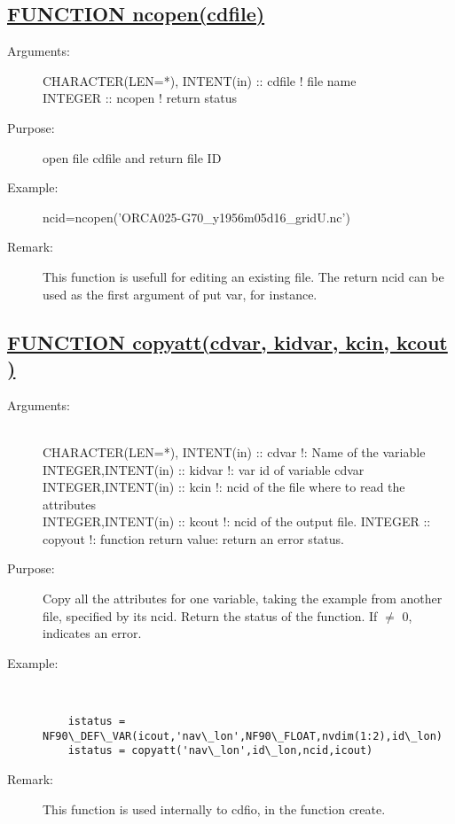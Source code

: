 \documentclass[a4paper,11pt]{article}
\begin{document}
\subsection*{\underline{ FUNCTION ncopen(cdfile) }}
\begin{description}
\item[Arguments:]  
      CHARACTER(LEN=*), INTENT(in) :: cdfile ! file name \\
      INTEGER :: ncopen                      ! return status
\item[Purpose:] open file cdfile and return file ID
\item[Example:]  ncid=ncopen('ORCA025-G70\_y1956m05d16\_gridU.nc')
\item[Remark:] This function is usefull for editing an existing file. The return ncid can be used as the first argument of
      put var, for instance.
\end{description}

\subsection*{\underline{ FUNCTION copyatt(cdvar, kidvar, kcin, kcout )}}
\begin{description}
\item[Arguments:] \ \\
CHARACTER(LEN=*), INTENT(in) :: cdvar !: Name of the variable \\
INTEGER,INTENT(in) :: kidvar   !: var id of variable cdvar \\
INTEGER,INTENT(in) :: kcin     !: ncid of the file where to read the attributes \\
INTEGER,INTENT(in) :: kcout     !: ncid of the output file.
INTEGER            :: copyout   !: function return value: return an error status.
\item[Purpose:] Copy all the attributes for one variable, taking the example from another file, specified by its
ncid. Return the status of the function. If $\neq$ 0, indicates an error.
\item[Example:] \ \\
\begin{verbatim}
    istatus = NF90\_DEF\_VAR(icout,'nav\_lon',NF90\_FLOAT,nvdim(1:2),id\_lon) 
    istatus = copyatt('nav\_lon',id\_lon,ncid,icout)
\end{verbatim}
\item[Remark:] This function is used internally to cdfio, in the function create.
\end{description}
\newpage
\end{document}
